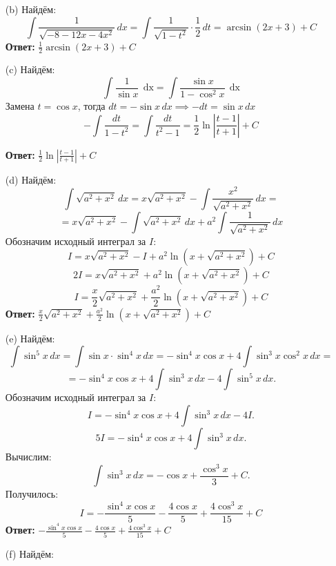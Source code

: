 \documentclass[a4paper]{article}
\renewcommand{\f}[2]{\frac{#1}{#2}}
\newcommand{\dx}{\;\text{dx}}
\begin{document}
\begin{enumerate}
\begin{enumerate}
        \item[(b)]Найдём:
        $$\int \frac{1}{\sqrt{-8 - 12x - 4x^2}} \, dx = \int \frac{1}{\sqrt{1 - t^2}} \cdot \f{1}{2} \, dt
         = \arcsin(2x+3) + C$$
         \textbf{Ответ: } $\f{1}{2} \arcsin(2x+3) + C$

        \item[(c)]Найдём:
        $$\int \frac{1}{\sin x} \, \dx = \int \frac{\sin x}{1 - \cos^2 x} \, \dx$$
        Замена \(t = \cos x\), тогда \(dt = -\sin x \, dx \implies -dt = \sin x \, dx\)
        $$-\int \frac{dt}{1 - t^2} =\int \frac{dt}{t^2-1}= \frac{1}{2} \ln \left| \frac{t-1}{t+1} \right| + C$$

        \textbf{Ответ: } $\frac{1}{2} \ln \left| \frac{t-1}{t+1} \right| + C$\\

        \item[(d)]Найдём:
        $$\int \sqrt{a^2 + x^2} \, dx = x \sqrt{a^2 + x^2} - \int \frac{x^2}{\sqrt{a^2 + x^2}} \, dx =$$
        $$=x \sqrt{a^2 + x^2} - \int \sqrt{a^2 + x^2} \, dx + a^2 \int \frac{1}{\sqrt{a^2 + x^2}} \, dx$$
        Обозначим исходный интеграл за \(I\): 
        \[
        I = x \sqrt{a^2 + x^2} - I + a^2 \ln \left(x + \sqrt{a^2 + x^2}\right) + C
        \]  
        \[
        2I = x \sqrt{a^2 + x^2} + a^2 \ln \left(x + \sqrt{a^2 + x^2}\right) + C
        \]
        \[
        I = \frac{x}{2} \sqrt{a^2 + x^2} + \frac{a^2}{2} \ln \left(x + \sqrt{a^2 + x^2}\right) + C
        \]  
        \textbf{Ответ: } $\frac{x}{2} \sqrt{a^2 + x^2} + \frac{a^2}{2} \ln \left(x + \sqrt{a^2 + x^2}\right) + C$\\

        \item[(e)]Найдём:
        \[
        \int \sin^5 x \, dx = \int \sin x \cdot \sin^4 x \, dx = -\sin^4 x \cos x + 4 \int \sin^3 x \cos^2 x \, dx=
        \]
        \[
        =-\sin^4 x \cos x+4 \int \sin^3 x \, dx - 4 \int \sin^5 x \, dx.
        \]
        Обозначим исходный интеграл за \(I\):
        \[
        I = -\sin^4 x \cos x + 4 \int \sin^3 x \, dx - 4I.
        \]
        \[
        5I = -\sin^4 x \cos x + 4 \int \sin^3 x \, dx.
        \]
        Вычислим:
        \[
        \int \sin^3 x \, dx = -\cos x + \frac{\cos^3 x}{3} + C.
        \]
        Получилось:
        \[
        I = -\frac{\sin^4 x \cos x}{5} - \frac{4\cos x}{5} + \frac{4\cos^3 x}{15} + C
        \]
        \textbf{Ответ: } $-\frac{\sin^4 x \cos x}{5} - \frac{4\cos x}{5} + \frac{4\cos^3 x}{15} + C$\\


        \item[(f)]Найдём:


    \end{enumerate}
\end{enumerate}
\end{document}
